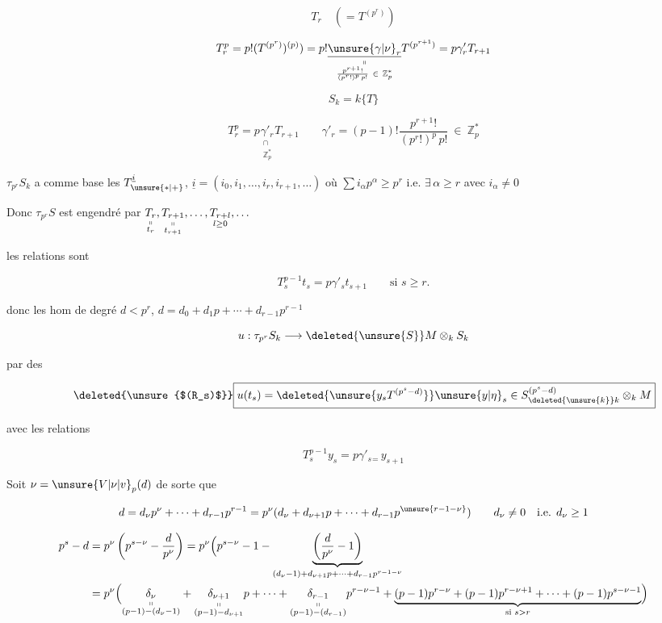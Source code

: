 
\[
T_r\quad(=T^{(p^r)})
\]


\[
T_r^p=p!(T^{(p^r)})^{(p)})=p!\underset{\substack{\shortparallel\\\frac{p^{r+1}!}{(p^r!)^p\,p!}\ \in\ \mathbb{Z}_p^{*}}}{\underline{\unsure{\gamma|\nu}_r}}T^{(p^{r+1})}=p\gamma'_r T_{r+1}
\]

\[
\boxed{S_k=k\{T\}}
\]

\[
\boxed{T_r^p=p\underset{\substack{\cap\\\mathbb{Z}_p^{*}}}{\gamma'_r}T_{r+1}}
\qquad
\gamma'_r=(p-1)!\frac{p^{r+1}!}{(p^r!)^p\,p!}\ \in\ \mathbb{Z}_p^{*}
\]

$\tau_{p^r}S_k$ a comme base les $T_{\unsure{*|+}}^{\underline{i}}$, $\underline{i}=(i_0,i_1,\ldots,i_r,i_{r+1},\ldots)$ où $\sum i_\alpha p^\alpha\geq p^r$ i.e. $\exists\,\alpha\geq r$ avec $i_\alpha\neq0$

Donc $\tau_{p^r}S$ est engendré par $\underset{\substack{\shortparallel\\t_r}}{T_r},\underset{\substack{\shortparallel\\t_{r+1}}}{T_{r+1}},\ldots,\underset{l\geq0}{T_{r+l}},\ldots$

les relations sont

\[
\boxed{T_s^{p-1}t_s=p\gamma'_s t_{s+1}\qquad\text{si }s\geq r}.
\]

donc les hom de degré $d<p^r$, $d=d_0+d_1p+\cdots+d_{r-1}p^{r-1}$

\[
u:\tau_{p^r}S_k\longrightarrow\deleted{\unsure{S}}M\otimes_k S_k
\]

 par des

\[
\tag*{\deleted{\unsure{$(R_s)$}}}
\boxed{u(t_s)=\deleted{\unsure{y_s T^{(p^s-d)}}}\unsure{y|\eta}_s\in S_{\deleted{\unsure{k}}k}^{(p^s-d)}\otimes_k M}
\]

avec les relations

\[
\tag*{$(R_s)$}
\boxed{T_s^{p-1}y_s=p\gamma'_s{}_{=}\,y_{s+1}}
\]

Soit $\nu=\unsure{V|\nu|v}_p(d)$ de sorte que

\[
d=d_\nu p^\nu+\cdots+d_{r-1}p^{r-1}=p^\nu(d_\nu+d_{\nu+1}p+\cdots+d_{r-1}p^{\unsure{r-1-\nu}})
\qquad d_\nu\neq0\quad\text{i.e. }d_\nu\geq1
\]

\[
\begin{aligned}
p^s-d&=p^\nu\left(p^{s-\nu}-\frac{d}{p^\nu}\right)
=p^\nu\Bigl(p^{s-\nu}-1-\underbrace{\left(\frac{d}{p^\nu}-1\right)}_{(d_\nu-1)+d_{\nu+1}p+\cdots+d_{r-1}p^{r-1-\nu}}\\
&=p^\nu\Bigl(
\underset{\substack{\shortparallel\\(p-1)-(d_\nu-1)}}{\delta_\nu}
+\underset{\substack{\shortparallel\\(p-1)-d_{\nu+1}}}{\delta_{\nu+1}}p+\cdots+
\underset{\substack{\shortparallel\\(p-1)-(d_{r-1})}}{\delta_{r-1}}p^{r-\nu-1}
+\underbrace{(p-1)p^{r-\nu}+(p-1)p^{r-\nu+1}+\cdots+(p-1)p^{s-\nu-1}}_{\text{si }s>r}\Bigr)
\end{aligned}
\]

